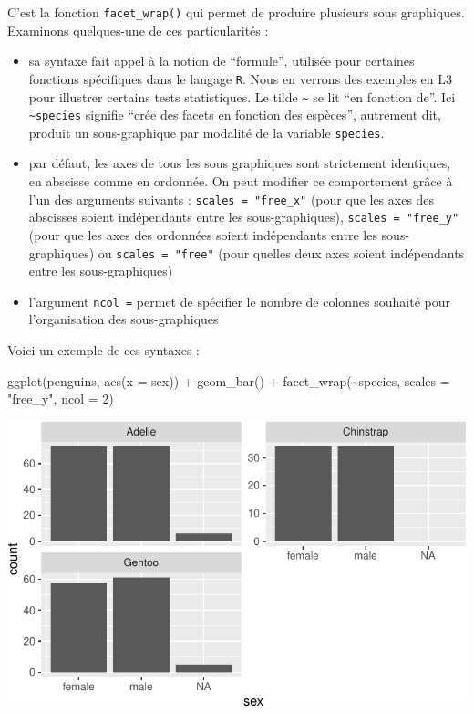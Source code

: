\documentclass[
  a4paper,
  DIV=11,
  numbers=noendperiod,
  oneside]{scrreprt}
\newenvironment{Shaded}{}{}
\newcommand{\AttributeTok}[1]{\textcolor[rgb]{0.84,0.23,0.29}{#1}}
\newcommand{\DecValTok}[1]{\textcolor[rgb]{0.00,0.36,0.77}{#1}}
\newcommand{\FunctionTok}[1]{\textcolor[rgb]{0.44,0.26,0.76}{#1}}
\newcommand{\NormalTok}[1]{\textcolor[rgb]{0.14,0.16,0.18}{#1}}
\newcommand{\SpecialCharTok}[1]{\textcolor[rgb]{0.00,0.36,0.77}{#1}}
\newcommand{\StringTok}[1]{\textcolor[rgb]{0.01,0.18,0.38}{#1}}
\providecommand{\tightlist}{%
  \setlength{\itemsep}{0pt}\setlength{\parskip}{0pt}}\usepackage{longtable,booktabs,array}
\begin{document}
C'est la fonction \texttt{facet\_wrap()} qui permet de produire
plusieurs sous graphiques. Examinons quelques-une de ces particularités
:

\begin{itemize}
\tightlist
\item
  sa syntaxe fait appel à la notion de ``formule'', utilisée pour
  certaines fonctions spécifiques dans le langage \texttt{R}. Nous en
  verrons des exemples en L3 pour illustrer certains tests statistiques.
  Le tilde \texttt{\textasciitilde{}} se lit ``en fonction de''. Ici
  \texttt{\textasciitilde{}species} signifie ``crée des facets en
  fonction des espèces'', autrement dit, produit un sous-graphique par
  modalité de la variable \texttt{species}.
\item
  par défaut, les axes de tous les sous graphiques sont strictement
  identiques, en abscisse comme en ordonnée. On peut modifier ce
  comportement grâce à l'un des arguments suivants :
  \texttt{scales\ =\ "free\_x"} (pour que les axes des abscisses soient
  indépendants entre les sous-graphiques), \texttt{scales\ =\ "free\_y"}
  (pour que les axes des ordonnées soient indépendants entre les
  sous-graphiques) ou \texttt{scales\ =\ "free"} (pour quelles deux axes
  soient indépendants entre les sous-graphiques)
\item
  l'argument \texttt{ncol\ =} permet de spécifier le nombre de colonnes
  souhaité pour l'organisation des sous-graphiques
\end{itemize}

Voici un exemple de ces syntaxes :

\begin{Shaded}
\begin{Highlighting}[]
\FunctionTok{ggplot}\NormalTok{(penguins, }\FunctionTok{aes}\NormalTok{(}\AttributeTok{x =}\NormalTok{ sex)) }\SpecialCharTok{+}
  \FunctionTok{geom\_bar}\NormalTok{() }\SpecialCharTok{+}
  \FunctionTok{facet\_wrap}\NormalTok{(}\SpecialCharTok{\textasciitilde{}}\NormalTok{species, }\AttributeTok{scales =} \StringTok{"free\_y"}\NormalTok{, }\AttributeTok{ncol =} \DecValTok{2}\NormalTok{)}
\end{Highlighting}
\end{Shaded}

\includegraphics{03-visualization_files/figure-pdf/unnamed-chunk-62-1.pdf}
\end{document}
